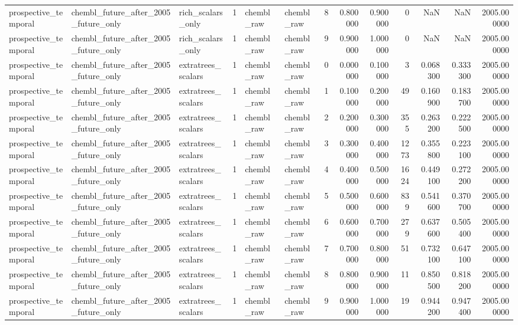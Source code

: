 \begin{longtable}{lllrllrrrrrrr}
prospective\_temporal & chembl\_future\_after\_2005\_future\_only & rich\_scalars\_only & 1 & chembl\_raw & chembl\_raw & 8 & 0.800000 & 0.900000 & 0 & NaN & NaN & 2005.000000 \\
prospective\_temporal & chembl\_future\_after\_2005\_future\_only & rich\_scalars\_only & 1 & chembl\_raw & chembl\_raw & 9 & 0.900000 & 1.000000 & 0 & NaN & NaN & 2005.000000 \\
prospective\_temporal & chembl\_future\_after\_2005\_future\_only & extratrees\_scalars & 1 & chembl\_raw & chembl\_raw & 0 & 0.000000 & 0.100000 & 3 & 0.068300 & 0.333300 & 2005.000000 \\
prospective\_temporal & chembl\_future\_after\_2005\_future\_only & extratrees\_scalars & 1 & chembl\_raw & chembl\_raw & 1 & 0.100000 & 0.200000 & 49 & 0.160900 & 0.183700 & 2005.000000 \\
prospective\_temporal & chembl\_future\_after\_2005\_future\_only & extratrees\_scalars & 1 & chembl\_raw & chembl\_raw & 2 & 0.200000 & 0.300000 & 355 & 0.263200 & 0.222500 & 2005.000000 \\
prospective\_temporal & chembl\_future\_after\_2005\_future\_only & extratrees\_scalars & 1 & chembl\_raw & chembl\_raw & 3 & 0.300000 & 0.400000 & 1273 & 0.355800 & 0.223100 & 2005.000000 \\
prospective\_temporal & chembl\_future\_after\_2005\_future\_only & extratrees\_scalars & 1 & chembl\_raw & chembl\_raw & 4 & 0.400000 & 0.500000 & 1624 & 0.449100 & 0.272200 & 2005.000000 \\
prospective\_temporal & chembl\_future\_after\_2005\_future\_only & extratrees\_scalars & 1 & chembl\_raw & chembl\_raw & 5 & 0.500000 & 0.600000 & 839 & 0.541600 & 0.370700 & 2005.000000 \\
prospective\_temporal & chembl\_future\_after\_2005\_future\_only & extratrees\_scalars & 1 & chembl\_raw & chembl\_raw & 6 & 0.600000 & 0.700000 & 279 & 0.637600 & 0.505400 & 2005.000000 \\
prospective\_temporal & chembl\_future\_after\_2005\_future\_only & extratrees\_scalars & 1 & chembl\_raw & chembl\_raw & 7 & 0.700000 & 0.800000 & 51 & 0.732100 & 0.647100 & 2005.000000 \\
prospective\_temporal & chembl\_future\_after\_2005\_future\_only & extratrees\_scalars & 1 & chembl\_raw & chembl\_raw & 8 & 0.800000 & 0.900000 & 11 & 0.850500 & 0.818200 & 2005.000000 \\
prospective\_temporal & chembl\_future\_after\_2005\_future\_only & extratrees\_scalars & 1 & chembl\_raw & chembl\_raw & 9 & 0.900000 & 1.000000 & 19 & 0.944200 & 0.947400 & 2005.000000 \\

\end{longtable}
